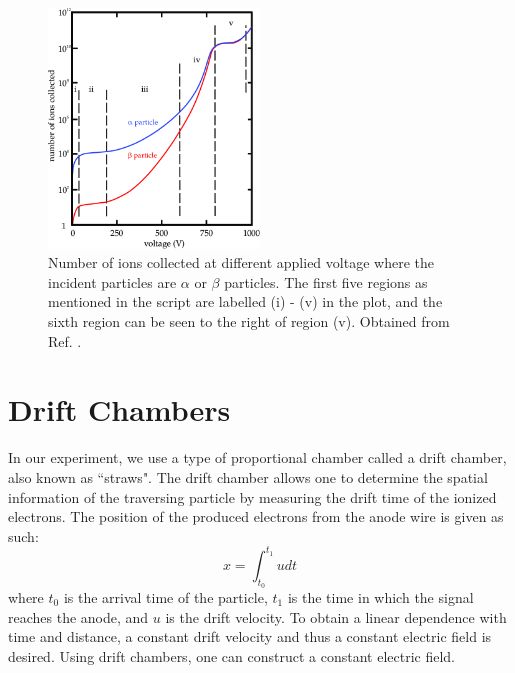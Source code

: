 \documentclass[a4paper]{report}
\numberwithin{equation}{section}
\begin{document}
\begin{figure}[!h]
	\centering
	\includegraphics[width=0.5\textwidth]{ionization_regions.png}
	\caption{Number of ions collected at different applied voltage where the incident particles are $\alpha$ or $\beta$ particles. 
	The first five regions as mentioned in the script are labelled (i) - (v) in the plot, and the sixth region can be seen to the right of region (v). 
	Obtained from Ref. \cite{Lukas2018}. }
	\label{fig:ionization_regions}	
\end{figure}

\section{Drift Chambers}

In our experiment, we use a type of proportional chamber called a drift chamber, also known as ``straws". The drift chamber allows one to determine the spatial information 
of the traversing particle by measuring the drift time of the ionized electrons. The position of the produced electrons from the anode wire is 
given as such: 
\begin{equation}
	x = \int_{t_0}^{t_1} u dt
\end{equation}
where $t_0$ is the arrival time of the particle, $t_1$ is the time in which the signal reaches the anode, and $u$ is the drift velocity. To obtain a 
linear dependence with time and distance, a constant drift velocity and thus a constant electric field is desired. Using drift chambers, one can 
construct a constant electric field. \par 
\end{document}
